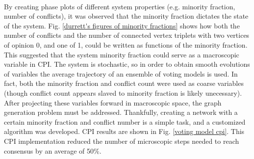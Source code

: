 \documentclass[11pt]{article}
\begin{document}
\\
By creating phase plots of different system properties (e.g. minority fraction, number of conflicts), it was observed that the minority fraction dictates the state of the system. Fig. \ref{durrett's figures of minority fractions} shows how both the number of conflicts and the number of connected vertex triplets with two vertices of opinion 0, and one of 1, could be written as functions of the minority fraction. This suggested that the system minority fraction could serve as a macroscopic variable in CPI. The system is stochastic, so in order to obtain smooth evolutions of variables the average trajectory of an ensemble of voting models is used. In fact, both the minority fraction and conflict count were used as coarse variables (though conflict count appears slaved to minority fraction is likely unecessary). After projecting these variables forward in macroscopic space, the graph generation problem must be addressed. Thankfully, creating a network with a certain minority fraction and conflict number is a simple task, and a customized algorithm was developed. CPI results are shown in Fig. \ref{voting model cpi}. This CPI implementation reduced the number of microscopic steps needed to reach consensus by an average of 50\%.\\
\end{document}
